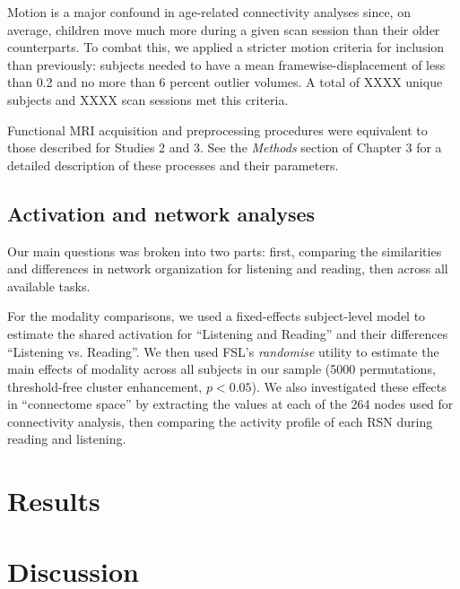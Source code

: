 Motion is a major confound in age-related connectivity analyses since, on average, children move much more during a given scan session than their older counterparts. To combat this, we applied a stricter motion criteria for inclusion than previously: subjects needed to have a mean framewise-displacement of less than 0.2 and no more than 6 percent outlier volumes. A total of XXXX unique subjects and XXXX scan sessions met this criteria. 

Functional MRI acquisition and preprocessing procedures were equivalent to those described for Studies 2 and 3. See the \textit{Methods} section of Chapter 3 for a detailed description of these processes and their parameters.

\subsection{Activation and network analyses}

Our main questions  was broken into two parts: first, comparing the similarities and differences in network organization for listening and reading, then across all available tasks. 

For the modality comparisons, we used a fixed-effects subject-level model to estimate the shared activation for ``Listening and Reading'' and their differences ``Listening vs. Reading''. We then used FSL's \textit{randomise} utility to estimate the main effects of modality across all subjects in our sample (5000 permutations, threshold-free cluster enhancement, $p < 0.05$).  We also investigated these effects in ``connectome space'' by extracting the values at each of the 264 nodes used for connectivity analysis, then comparing the activity profile of each RSN during reading and listening.

\section{Results}

\section{Discussion}




